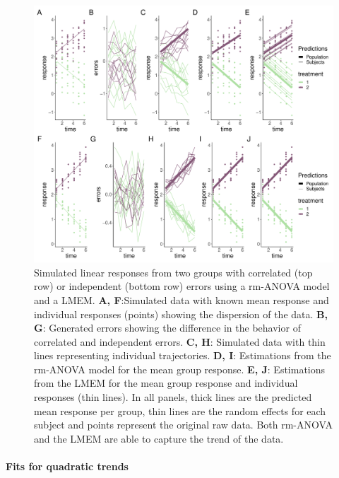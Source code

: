 \documentclass[
]{article}
\begin{document}
\begin{figure}

{\centering \includegraphics[width=1\linewidth]{Appendix_B_files/figure-latex/linear-cases-Appendix-1} 

}

\caption{Simulated linear responses from two groups with correlated (top row) or independent (bottom row) errors using a rm-ANOVA model and a LMEM. \textbf{A, F}:Simulated data with known mean response and individual responses (points) showing the dispersion of the data. \textbf{B, G}: Generated errors showing the difference in the behavior of correlated and independent errors. \textbf{C, H}: Simulated data with thin lines representing individual trajectories. \textbf{D, I}: Estimations from the rm-ANOVA model for the mean group response. \textbf{E, J}: Estimations from the LMEM for the mean group response and individual responses (thin lines). In all panels, thick lines are the predicted mean response per group, thin lines are the random effects for each subject and points represent the original raw data. Both rm-ANOVA and the LMEM are able to capture the trend of the data.}\label{fig:linear-cases-Appendix}
\end{figure}

\hypertarget{fits-for-quadratic-trends}{%
\paragraph{Fits for quadratic trends}\label{fits-for-quadratic-trends}}
\end{document}
